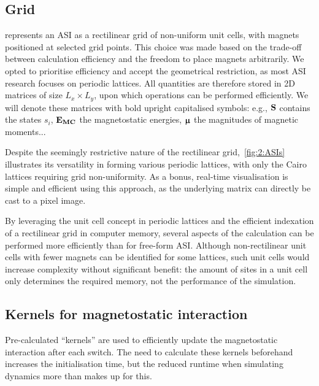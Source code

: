 \subsection{Grid}
\hotspice{} represents an ASI as a rectilinear grid of non-uniform unit cells, with magnets positioned at selected grid points.
This choice was made based on the trade-off between calculation efficiency and the freedom to place magnets arbitrarily.
We opted to prioritise efficiency and accept the geometrical restriction, as most ASI research focuses on periodic lattices.
All quantities are therefore stored in 2D matrices of size $L_x \times L_y$, upon which operations can be performed efficiently.
We will denote these matrices with bold upright capitalised symbols: e.g., $\boldsymbol{\mathbf{S}}$ contains the states $s_i$, $\boldsymbol{\mathbf{E_\mathrm{MC}}}$ the magnetostatic energies, $\boldsymbol{\mathbf{\upmu}}$ the magnitudes of magnetic moments... \par %
Despite the seemingly restrictive nature of the rectilinear grid,~\cref{fig:2:ASIs} illustrates its versatility in forming various periodic lattices, with only the Cairo lattices requiring grid non-uniformity.
As a bonus, real-time visualisation is simple and efficient using this approach, as the underlying matrix can directly be cast to a pixel image. \par
By leveraging the unit cell concept in periodic lattices and the efficient indexation of a rectilinear grid in computer memory, several aspects of the calculation can be performed more efficiently than for free-form ASI.
Although non-rectilinear unit cells with fewer magnets can be identified for some lattices, such unit cells would increase complexity without significant benefit: the amount of sites in a unit cell only determines the required memory, not the performance of the simulation.

\subsection{Kernels for magnetostatic interaction}\label{sec:2:Kernels}
Pre-calculated ``kernels'' are used to efficiently update the magnetostatic interaction after each switch. 
The need to calculate these kernels beforehand increases the initialisation time, but the reduced runtime when simulating dynamics more than makes up for this.

